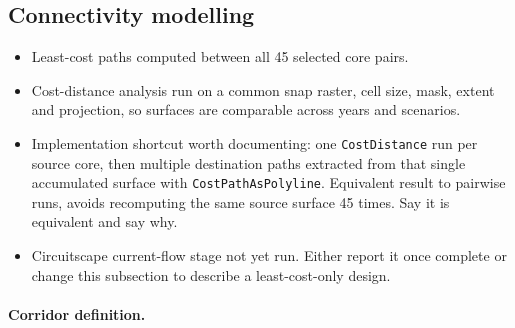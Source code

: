 \subsection{Connectivity modelling}
\label{sec:connectivity}

\begin{outline}
\begin{itemize}
  \item Least-cost paths computed between all 45 selected core pairs.
  \item Cost-distance analysis run on a common snap raster, cell size, mask, extent and
        projection, so surfaces are comparable across years and scenarios.
  \item Implementation shortcut worth documenting: one \texttt{CostDistance} run per
        source core, then multiple destination paths extracted from that single
        accumulated surface with \texttt{CostPathAsPolyline}. Equivalent result to
        pairwise runs, avoids recomputing the same source surface 45 times. Say it is
        equivalent and say why.
  \item Circuitscape current-flow stage not yet run. Either report it once complete or
        change this subsection to describe a least-cost-only design.
\end{itemize}
\end{outline}

\paragraph{Corridor definition.}

